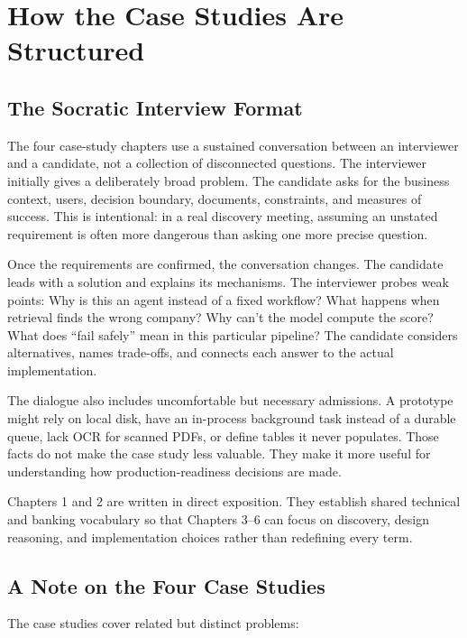 \chapter*{How the Case Studies Are Structured}

\section*{The Socratic Interview Format}

The four case-study chapters use a sustained conversation between an interviewer and a candidate, not a collection of disconnected questions. The interviewer initially gives a deliberately broad problem. The candidate asks for the business context, users, decision boundary, documents, constraints, and measures of success. This is intentional: in a real discovery meeting, assuming an unstated requirement is often more dangerous than asking one more precise question.

Once the requirements are confirmed, the conversation changes. The candidate leads with a solution and explains its mechanisms. The interviewer probes weak points: Why is this an agent instead of a fixed workflow? What happens when retrieval finds the wrong company? Why can't the model compute the score? What does ``fail safely'' mean in this particular pipeline? The candidate considers alternatives, names trade-offs, and connects each answer to the actual implementation.

The dialogue also includes uncomfortable but necessary admissions. A prototype might rely on local disk, have an in-process background task instead of a durable queue, lack OCR for scanned PDFs, or define tables it never populates. Those facts do not make the case study less valuable. They make it more useful for understanding how production-readiness decisions are made.

Chapters 1 and 2 are written in direct exposition. They establish shared technical and banking vocabulary so that Chapters 3--6 can focus on discovery, design reasoning, and implementation choices rather than redefining every term.

\section*{A Note on the Four Case Studies}

The case studies cover related but distinct problems:


